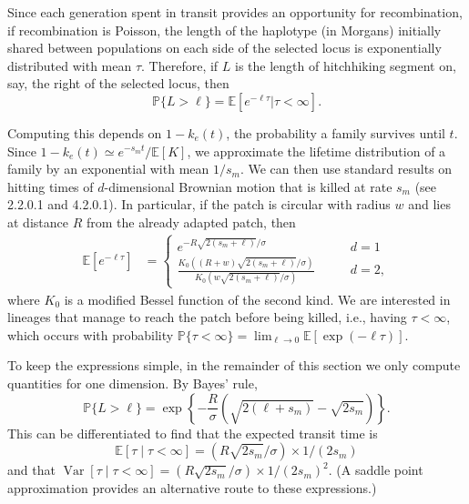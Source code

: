 \documentclass[10pt,letterpaper]{article}
\newcommand{\citet}[1]{\cite{#1}}
\DeclareMathOperator{\var}{Var}
\renewcommand{\P}{\mathbb{P}}
\newcommand{\E}{\mathbb{E}}
\newcommand{\given}{\mid}
\begin{document}
Since each generation spent in transit provides an opportunity for recombination,
if recombination is Poisson, the length of the haplotype (in Morgans)
initially shared between populations on each side of the selected locus is exponentially distributed
with mean $\tau$. 
Therefore, if $L$ is the length of hitchhiking segment on, say, the right of
the selected locus, then
\begin{equation} \label{eqn:haplen_cdf2}
\P\{L>\ell\} = \E[e^{-\ell \tau}|\tau<\infty] .
\end{equation}

Computing this depends on $1-k_e(t)$, 
the probability a family survives until $t$.
Since $1-k_e(t) \simeq e^{-s_m t} / \E[K]$,
we approximate the lifetime distribution of a family by an exponential with mean $1/s_m$.
We can then use standard results on hitting times of $d$-dimensional Brownian motion
that is killed at rate $s_m$ (see \citet{borodin2002handbook} 2.2.0.1 and 4.2.0.1).
In particular, if the patch is circular with radius $w$ and lies at distance
$R$ from the already adapted patch, then 
\begin{align}
  \E[e^{-\ell \tau}] &=
    \begin{cases}
      e^{- R \sqrt{2(s_m+\ell)}/\sigma} \qquad & d=1 \\
      \frac{ K_0( (R+w)\sqrt{2(s_m+\ell)}/\sigma) }{ K_0( w\sqrt{2(s_m+\ell)}/\sigma) } \qquad & d=2  ,
    \end{cases} \label{eqn:borodinresult}
\end{align}
where $K_0$ is a modified Bessel function of the second kind.
We are interested in lineages that manage to reach the patch before being killed,
i.e., having $\tau < \infty$,
which occurs with probability
$\P\{\tau < \infty\} = \lim_{\ell \to 0} \E \left[\exp(-\ell \tau) \right]$. 

To keep the expressions simple, in the remainder of this section we only compute quantities for one dimension.
By Bayes' rule, 
\begin{equation} \label{eqn:haplen_cdf}
    \P\{ L > \ell \}
    = 
    \exp\left\{{-\frac{R}{\sigma}\left(\sqrt{2(\ell+s_m)} - \sqrt{2s_m}\right)}\right\} .
\end{equation}
This can be differentiated to find that the expected transit time is
\begin{equation} 
  \E[\tau \given \tau<\infty ] = (R\sqrt{2s_m}/\sigma)\times 1/(2s_m) \label{eqn:mean_tau}
\end{equation}
and that $\var[\tau \given \tau<\infty ] = (R\sqrt{2s_m}/\sigma) \times 1/(2s_m)^2$.
(A saddle point approximation provides an alternative route to these expressions.)
\end{document}
